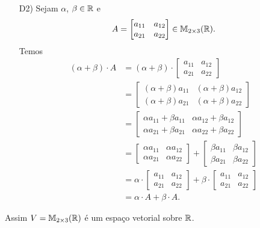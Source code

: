 \documentclass[12pt]{exam}
\begin{document}
\begin{itemize}
        \item[D2)] Sejam $\alpha$, $\beta \in \mathbb{R}$ e
        \[
        A = \begin{bmatrix} a_{11} & a_{12}\\a_{21} & a_{22}\end{bmatrix} \in \mathbb{M}_{2 \times 3}(\mathbb{R}).
        \]
        Temos
        \begin{align*}
            (\alpha + \beta)\cdot A & = (\alpha + \beta)\cdot\begin{bmatrix} a_{11} & a_{12}\\a_{21} & a_{22}\end{bmatrix}
            \\ &= \begin{bmatrix} (\alpha + \beta)a_{11} & (\alpha + \beta)a_{12}\\(\alpha + \beta)a_{21} & (\alpha + \beta)a_{22}\end{bmatrix}
            \\ &= \begin{bmatrix} \alpha a_{11} + \beta a_{11} & \alpha a_{12} + \beta a_{12}\\\alpha a_{21} + \beta a_{21} & \alpha a_{22} + \beta a_{22}\end{bmatrix}
            \\ &= \begin{bmatrix} \alpha a_{11} & \alpha a_{12}\\ \alpha a_{21} & \alpha a_{22}\end{bmatrix}
            + \begin{bmatrix} \beta a_{11} & \beta a_{12}\\ \beta a_{21} & \beta a_{22}\end{bmatrix}
            \\ &= \alpha\cdot\begin{bmatrix} a_{11} & a_{12}\\a_{21} & a_{22}\end{bmatrix}  + \beta\cdot\begin{bmatrix} a_{11} & a_{12}\\a_{21} & a_{22}\end{bmatrix}
            \\ &= \alpha\cdot A + \beta\cdot A.
        \end{align*}
    \end{itemize}
    Assim $V = \mathbb{M}_{2 \times 3}(\mathbb{R})$ é um espaço vetorial sobre $\mathbb{R}$.
\end{document}
